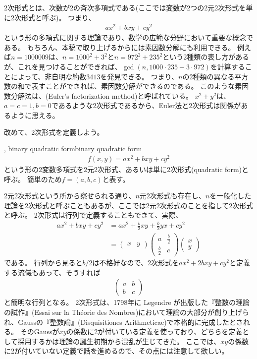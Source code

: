 2次形式とは、次数が2の斉次多項式である(ここでは変数が2つの2元2次形式を単に2次形式と呼ぶ)。
つまり、
\begin{align*}
ax^2 + bxy + cy^2
\end{align*}
という形の多項式に関する理論であり、数学の広範な分野において重要な概念である。
もちろん、本稿で取り上げるからには素因数分解にも利用できる。
例えば$n=1000009$は、$n=1000^2+3^2$と$n=972^2+235^2$という2種類の表し方があるが、これを見つけることができれば、$\gcd(n, 1000\cdot235 - 3\cdot972)$を計算することによって、非自明な約数$3413$を発見できる。
つまり、$n$の2種類の異なる平方数の和で表すことができれば、素因数分解ができるのである。
このような素因数分解法は、(Euler's factorization method)と呼ばれている。
$x^2+y^2$は、$a=c=1,b=0$であるような2次形式であるから、Euler法と2次形式は関係があるように思える。

改めて、2次形式を定義しよう。

\begin{Defi}{, binary quadratic form}{binary quadratic form}
\begin{align*}
f(x,y) = ax^2 + bxy + cy^2
\end{align*}
という形の2変数多項式を2元2次形式、あるいは単に2次形式(quadratic form)と呼ぶ。
簡単のため$f=(a,b,c)$と表す。
\end{Defi}

2元2次形式という所から察せられる通り、$n$元2次形式も存在し、$n$を一般化した理論を2次形式と呼ぶこともあるが、ここでは2元2次形式のことを指して2次形式と呼ぶ。
2次形式は行列で定義することもできて、実際、
\begin{align*}
ax^2 + bxy + cy^2 &= ax^2 + \frac{b}{2}xy + \frac{b}{2}yx + cy^2\\
&=
\begin{pmatrix}
x & y
\end{pmatrix}
\begin{pmatrix}
a & \frac{b}{2}\\
\frac{b}{2} & c
\end{pmatrix}
\begin{pmatrix}
x\\
y
\end{pmatrix}
\end{align*}
である。
行列から見ると$b/2$は不格好なので、2次形式を$ax^2+2bxy+cy^2$と定義する流儀もあって、そうすれば
\begin{align*}
\begin{pmatrix}
a & b\\
b & c
\end{pmatrix}
\end{align*}
と簡明な行列となる。
2次形式は、1798年に Legendre が出版した『整数の理論の試作』(Essai sur la Théorie des Nombres)において理論の大部分が創り上げられ、Gaussの『整数論』(Disquisitiones Arithmeticae)で本格的に完成したとされる。
そのGaussが$xy$の係数に2が付いている定義を使っており、どちらを定義として採用するかは理論の誕生初期から混乱が生じてきた。
ここでは、$xy$の係数に2が付いていない定義で話を進めるので、その点には注意して欲しい。

